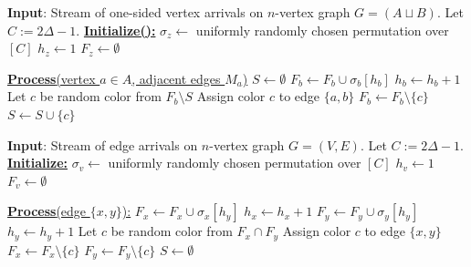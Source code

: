 \documentclass[10pt]{article}
\theoremstyle{definition}\newtheorem{definition}[lemma]{Definition}
\theoremstyle{remark}  \newtheorem*{remark}{Remark}
\newcommand{\tO}{\widetilde{O}}
\begin{document}
\begin{algorithm}[htb!]
  \caption{A simple randomized algorithm for $(2\Delta-1)$-edge coloring in the one-sided vertex arrival model which is conjectured to use $O(n \log \Delta)$ space w.h.p.; and uses $\tO(n\Delta)$ oracle random bits\label{alg:conj-va}}
  \begin{algorithmic}[1]
  \Statex \textbf{Input}: Stream of one-sided vertex arrivals on $n$-vertex graph $G=(A \sqcup B)$. 
    \Statex Let $C := 2 \Delta - 1$.
    \Statex
    \Statex \underline{\textbf{Initialize():}}
        \State $\sigma_z \gets$ uniformly randomly chosen permutation over $[C]$
        \State $h_z \gets 1$
        \State $F_z \gets \emptyset$
      \EndFor
    
  \Statex 
  \Statex\underline{\textbf{Process}(vertex $a \in A$, adjacent edges $M_a$)}
    \State $S \gets \emptyset$
        \State $F_b \gets F_b \cup \sigma_b[h_b]$
        \State $h_b \gets h_b + 1$
      \EndWhile
      \State Let $c$ be random color from $F_b \setminus S$
      \State Assign color $c$ to edge $\{a,b\}$
      \State $F_b \gets F_b \setminus \{c\}$
      \State $S \gets S \cup \{c\}$
    \EndFor
  \end{algorithmic}
\end{algorithm}


\begin{algorithm}[htb!]
  \caption{A simple randomized algorithm for $(2\Delta-1)$-edge coloring in the edge arrival model which is conjectured to use $O(n \sqrt{\Delta} \log \Delta)$ space w.h.p.; and uses $\tO(n\Delta)$ oracle random bits\label{alg:conj-ea}}
  \begin{algorithmic}[1]
  \Statex \textbf{Input}: Stream of edge arrivals on $n$-vertex graph $G=(V, E)$. 
    \Statex Let $C := 2 \Delta - 1$.
    \Statex
    \Statex \underline{\textbf{Initialize:}}
        \State $\sigma_v \gets$ uniformly randomly chosen permutation over $[C]$
        \State $h_v \gets 1$
        \State $F_v \gets \emptyset$
      \EndFor
    
  \Statex 
  \Statex\underline{\textbf{Process}(edge $\{x,y\}$):}
        \State $F_x \gets F_x \cup \sigma_x[h_y]$
        \State $h_x \gets h_x + 1$
        \State $F_y \gets F_y \cup \sigma_y[h_y]$
        \State $h_y \gets h_y + 1$
    \EndWhile
    \State Let $c$ be random color from $F_x \cap F_y$
    \State Assign color $c$ to edge $\{x,y\}$
    \State $F_x \gets F_x \setminus \{c\}$
    \State $F_y \gets F_y \setminus \{c\}$
    \State $S \gets \emptyset$
  \end{algorithmic}
\end{algorithm}





\end{document}
